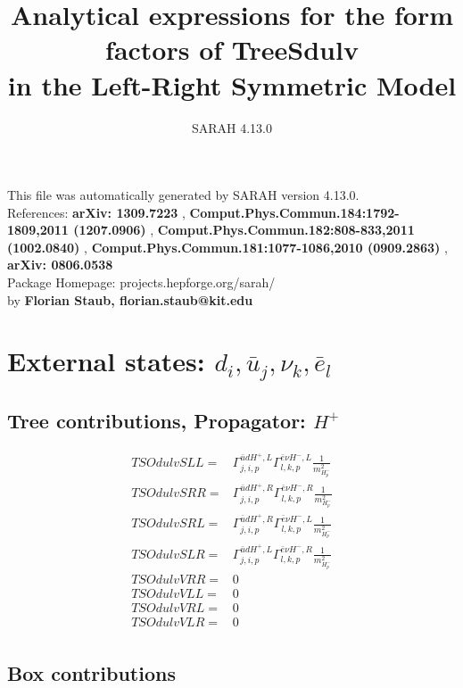 \documentclass[A4,landscape]{article}
\begin{document}
\title{Analytical expressions for the form factors of TreeSdulv\\ in the Left-Right Symmetric Model } 
 \author{SARAH 4.13.0} 
 \maketitle 
 \vspace{10cm} 
This file was automatically generated by SARAH version 4.13.0.  \\ 
References: {\bf arXiv: 1309.7223 }, {\bf Comput.Phys.Commun.184:1792-1809,2011 (1207.0906) }, {\bf Comput.Phys.Commun.182:808-833,2011 (1002.0840) }, {\bf Comput.Phys.Commun.181:1077-1086,2010 (0909.2863) }, {\bf arXiv: 0806.0538 } \\ 
Package Homepage: projects.hepforge.org/sarah/ \\ 
by {\bf Florian Staub, florian.staub@kit.edu} 
 \pagebreak 
 \tableofcontents 
 \pagebreak 
\section{External states: ${d_{{i}}, \bar{u}_{{j}}, \nu_{{k}}, \bar{e}_{{l}}}$} 
\subsection{Tree contributions, Propagator: $H^+$} 

\begin{align} 
  TSOdulvSLL= & \Gamma^{\bar{u}d H^+,L}_{j, i, p} \Gamma^{\bar{e}\nu H^- ,L}_{l, k, p} \frac{1}{m^2_{H^-_{{p}}}} \\ 
  TSOdulvSRR= & \Gamma^{\bar{u}d H^+,R}_{j, i, p} \Gamma^{\bar{e}\nu H^- ,R}_{l, k, p} \frac{1}{m^2_{H^-_{{p}}}} \\ 
  TSOdulvSRL= & \Gamma^{\bar{u}d H^+,R}_{j, i, p} \Gamma^{\bar{e}\nu H^- ,L}_{l, k, p} \frac{1}{m^2_{H^-_{{p}}}} \\ 
  TSOdulvSLR= & \Gamma^{\bar{u}d H^+,L}_{j, i, p} \Gamma^{\bar{e}\nu H^- ,R}_{l, k, p} \frac{1}{m^2_{H^-_{{p}}}} \\ 
  TSOdulvVRR= & 0 \\ 
  TSOdulvVLL= & 0 \\ 
  TSOdulvVRL= & 0 \\ 
  TSOdulvVLR= & 0 \\ 
\end{align} 
\subsection{Box contributions} 
\end{document}
